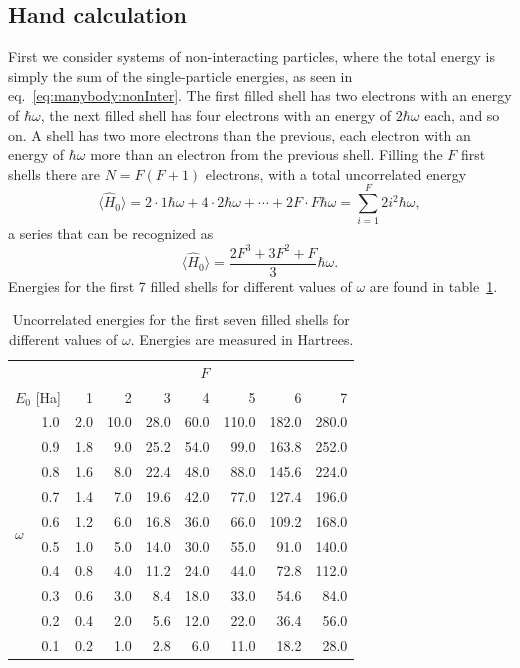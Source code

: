 \subsection{Hand calculation}
First we consider systems of non-interacting particles, where the total energy is simply the sum of the single-particle energies, as seen in eq.~\eqref{eq:manybody:nonInter}.
The first filled shell has two electrons with an energy of $\hbar \omega$, the next filled shell has four electrons with an energy of $2\hbar \omega$ each, and so on.
A shell has two more electrons than the previous, each electron with an energy of $\hbar \omega$ more than an electron from the previous shell.
Filling the $F$ first shells there are $N=F(F+1)$ electrons, with a total uncorrelated energy
\begin{equation}
\langle \hat{H}_0 \rangle = 
2 \cdot 1\hbar \omega 
+ 
4 \cdot 2\hbar \omega 
+
\cdots
+
2F \cdot F\hbar \omega
=
\sum_{i=1}^F 2 i^2 \hbar\omega , 
\end{equation}
a series that can be recognized as 
\begin{equation}
\langle \hat{H}_0 \rangle = \frac{2F^3 + 3F^2 + F}{3} \hbar \omega .
\end{equation}
Energies for the first 7 filled shells for different values of $\omega$ are found in table~\ref{tab:results:Euncorr}.
\begin{table}
\begin{center}
\caption{Uncorrelated energies for the first seven filled shells for different values of $\omega$. Energies are measured in Hartrees.}
\label{tab:results:Euncorr}
\begin{tabular}{lc|rrrrrrr}
& & & & & $F$ \\
\multicolumn{2}{c|}{$E_0$ [Ha]}  &    1  &   2  &   3    &  4   &  5    &  6    &  7   \\
\hline \hline
& 1.0   &   2.0 & 10.0 & 28.0   & 60.0 & 110.0 & 182.0 & 280.0 \\
& 0.9   &   1.8 &  9.0 & 25.2   & 54.0 &  99.0 & 163.8 & 252.0 \\
& 0.8   &   1.6 &  8.0 & 22.4   & 48.0 &  88.0 & 145.6 & 224.0 \\
& 0.7   &   1.4 &  7.0 & 19.6   & 42.0 &  77.0 & 127.4 & 196.0 \\
\multirow{2}{*}{$\omega$} & 0.6   &   1.2 &  6.0 & 16.8   & 36.0 &  66.0 & 109.2 & 168.0 \\ 
& 0.5   &   1.0 &  5.0 & 14.0   & 30.0 &  55.0 &  91.0 & 140.0 \\
& 0.4   &   0.8 &  4.0 & 11.2   & 24.0 &  44.0 &  72.8 & 112.0  \\
& 0.3   &   0.6 &  3.0 &  8.4   & 18.0 &  33.0 &  54.6 &  84.0  \\
& 0.2   &   0.4 &  2.0 &  5.6   & 12.0 &  22.0 &  36.4 &  56.0 \\
& 0.1   &   0.2 &  1.0 &  2.8   &  6.0 &  11.0 &  18.2 &  28.0  \\
\hline \hline
\end{tabular}
\end{center}
\end{table}
